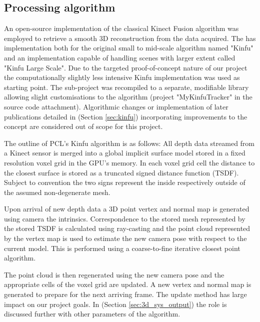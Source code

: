 \documentclass{ucl_thesis}
\newcommand{\secref}[1]{(Section \ref{#1})}
\begin{document}
\subsection{Processing algorithm}
\par An open-source implementation of the classical Kinect Fusion algorithm was employed to retrieve a smooth 3D reconstruction from the data acquired. The \citep{PCL} has implementation both for the original small to mid-scale algorithm named "Kinfu" and an implementation capable of handling scenes with larger extent called "Kinfu Large Scale". Due to the targeted proof-of-concept nature of our project the computationally slightly less intensive Kinfu implementation was used as starting point. The sub-project was recompiled to a separate, modifiable library allowing slight customisations to the algorithm (project "MyKinfuTracker" in the source code attachment). Algorithmic changes or implementation of later publications detailed in \secref{sec:kinfu} incorporating improvements to the concept are considered out of scope for this project.\\

\par The outline of PCL's Kinfu algorithm is as follows: All depth data streamed from a Kinect sensor is merged into a global implicit surface model stored in a fixed resolution voxel grid in the GPU's memory. In each voxel grid cell the distance to the closest surface is stored as a truncated signed distance function (TSDF). Subject to convention the two signs represent the inside respectively outside of the assumed non-degenerate mesh. 
\par Upon arrival of new depth data a 3D point vertex and normal map is generated using camera the intrinsics. Correspondence to the stored mesh represented by the stored TSDF is calculated using ray-casting and the point cloud represented by the vertex map is used to estimate the new camera pose with respect to the current model. This is performed using a coarse-to-fine iterative closest point algorithm. 
\par The point cloud is then regenerated using the new camera pose and the appropriate cells of the voxel grid are updated. A new vertex and normal map is generated to prepare for the next arriving frame. The update method has large impact on our project goals. In \secref{sec:3d_sys_output} the role is discussed further with other parameters of the algorithm. \\
\end{document}
